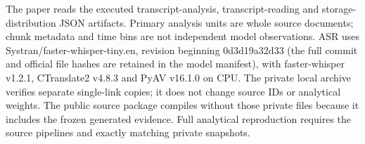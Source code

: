 The paper reads the executed transcript-analysis, transcript-reading and storage-distribution JSON artifacts. Primary analysis units are whole source documents; chunk metadata and time bins are not independent model observations. ASR uses Systran/faster-whisper-tiny.en, revision beginning 0d3d19a32d33 (the full commit and official file hashes are retained in the model manifest), with faster-whisper v1.2.1, CTranslate2 v4.8.3 and PyAV v16.1.0 on CPU. The private local archive verifies separate single-link copies; it does not change source IDs or analytical weights. The public source package compiles without those private files because it includes the frozen generated evidence. Full analytical reproduction requires the source pipelines and exactly matching private snapshots.

